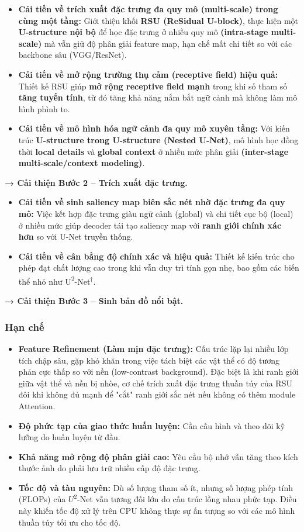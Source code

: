 \begin{itemize}
    \item \textbf{Cải tiến về trích xuất đặc trưng đa quy mô (multi-scale) trong cùng một tầng:} 
    Giới thiệu khối \textbf{RSU (ReSidual U-block)}, thực hiện một \textbf{U-structure nội bộ} để học đặc trưng ở nhiều quy mô \textbf{(intra-stage multi-scale)} mà vẫn giữ độ phân giải feature map, hạn chế mất chi tiết so với các backbone sâu (VGG/ResNet).
    \item \textbf{Cải tiến về mở rộng trường thụ cảm (receptive field) hiệu quả:}
    Thiết kế RSU giúp \textbf{mở rộng receptive field mạnh} trong khi số tham số \textbf{tăng tuyến tính}, từ đó tăng khả năng nắm bắt ngữ cảnh mà không làm mô hình phình to.
    \item \textbf{Cải tiến về mô hình hóa ngữ cảnh đa quy mô xuyên tầng:}
    Với kiến trúc \textbf{U-structure trong U-structure (Nested U-Net)}, mô hình học đồng thời \textbf{local details} và \textbf{global context} ở nhiều mức phân giải \textbf{(inter-stage multi-scale/context modeling)}.
\end{itemize}
\textbf{→ Cải thiện Bước 2 – Trích xuất đặc trưng.}

\begin{itemize}
    \item \textbf{Cải tiến về sinh saliency map biên sắc nét nhờ đặc trưng đa quy mô:}
    Việc kết hợp đặc trưng giàu ngữ cảnh (global) và chi tiết cục bộ (local) ở nhiều mức giúp decoder tái tạo saliency map với \textbf{ranh giới chính xác hơn} so với U-Net truyền thống.
    \item \textbf{Cải tiến về cân bằng độ chính xác và hiệu quả:}
    Thiết kế kiến trúc cho phép đạt chất lượng cao trong khi vẫn duy trì tính gọn nhẹ, bao gồm các biến thể nhỏ như U\textsuperscript{2}-Net$^\dagger$.
\end{itemize}
\textbf{→ Cải thiện Bước 3 – Sinh bản đồ nổi bật.}

\subsubsection{Hạn chế}
\begin{itemize}
    \item \textbf{Feature Refinement (Làm mịn đặc trưng):} Cấu trúc lặp lại nhiều lớp tích chập sâu, gặp khó khăn trong việc tách biệt các vật thể có độ tương phản cực thấp so với nền (low-contrast background). Đặc biệt là khi ranh giới giữa vật thể và nền bị nhòe, cơ chế trích xuất đặc trưng thuần túy của RSU đôi khi không đủ mạnh để "cắt" ranh giới sắc nét nếu không có thêm module Attention.
    \item \textbf{Độ phức tạp của giao thức huấn luyện:} Cần cấu hình và theo dõi kỹ lưỡng do huấn luyện từ đầu.
    \item \textbf{Khả năng mở rộng độ phân giải cao:} Yêu cầu bộ nhớ vẫn tăng theo kích thước ảnh do phải lưu trữ nhiều cấp độ đặc trưng.
    \item \textbf{Tốc độ  và tàu nguyên:} Dù số lượng tham số ít, nhưng số lượng phép tính (FLOPs) của $U^2$-Net vẫn tương đối lớn do cấu trúc lồng nhau phức tạp. Điều này khiến tốc độ xử lý trên CPU không thực sự ấn tượng so với các mô hình thuần túy tối ưu cho tốc độ.
\end{itemize}